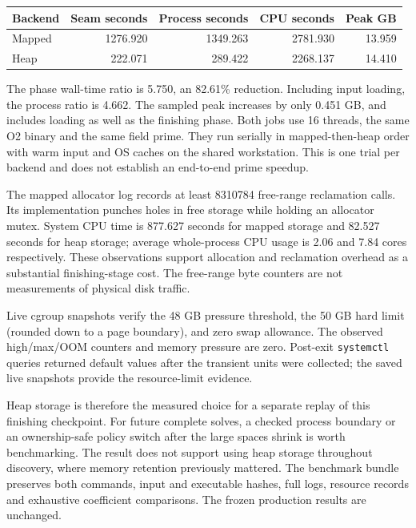 \documentclass[11pt]{article}
\begin{document}
\begin{center}
\begin{tabular}{lrrrr}\toprule
Backend & Seam seconds & Process seconds & CPU seconds & Peak GB\\\midrule
Mapped & 1276.920 & 1349.263 & 2781.930 & 13.959\\
Heap & 222.071 & 289.422 & 2268.137 & 14.410\\
\bottomrule
\end{tabular}
\end{center}
The phase wall-time ratio is 5.750, an 82.61\% reduction. Including input
loading, the process ratio is 4.662. The sampled peak increases by only
0.451 GB, and includes loading as well as the finishing phase. Both jobs
use 16 threads, the same O2 binary and the same field prime. They run serially
in mapped-then-heap order with warm input and OS caches on the shared
workstation. This is one trial per backend and does not establish an
end-to-end prime speedup.

The mapped allocator log records at least 8310784 free-range reclamation
calls. Its implementation punches holes in free storage while holding an
allocator mutex. System CPU time is 877.627 seconds for mapped storage and
82.527 seconds for heap storage; average whole-process CPU usage is 2.06
and 7.84 cores respectively. These observations support allocation and
reclamation overhead as a substantial finishing-stage cost. The free-range
byte counters are not measurements of physical disk traffic.

Live cgroup snapshots verify the 48 GB pressure threshold, the 50 GB hard
limit (rounded down to a page boundary), and zero swap allowance. The
observed high/max/OOM counters and memory pressure are zero. Post-exit
\texttt{systemctl} queries returned default values after the transient units
were collected; the saved live snapshots provide the resource-limit evidence.

Heap storage is therefore the measured choice for a separate replay of
this finishing checkpoint. For future complete solves, a checked process
boundary or an ownership-safe policy switch after the large spaces shrink
is worth benchmarking. The result does not support using heap storage
throughout discovery, where memory retention previously mattered. The
benchmark bundle preserves both commands, input and executable hashes,
full logs, resource records and exhaustive coefficient comparisons. The
frozen production results are unchanged.
\end{document}

